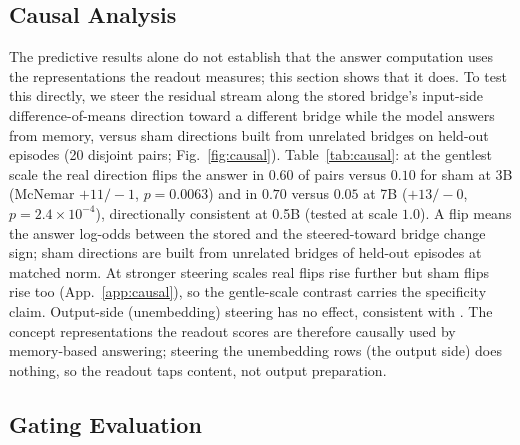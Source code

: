 

\subsection{Causal Analysis}
\label{sec:causal}

The predictive results alone do not establish that the answer computation uses
the representations the readout measures; this section shows that it does.
To test this directly, we steer the residual stream along the stored bridge's
input-side difference-of-means direction \citep{zou2023repe} toward a
different bridge while the model answers from memory, versus sham directions
built from unrelated bridges on held-out episodes (20 disjoint pairs;
Fig.~\ref{fig:causal}).
Table~\ref{tab:causal}: at the gentlest scale the real direction flips the
answer in $0.60$ of pairs versus $0.10$ for sham at 3B (McNemar $+11/-1$,
$p{=}0.0063$) and in $0.70$ versus $0.05$ at 7B ($+13/-0$,
$p{=}2.4\times10^{-4}$), directionally consistent at 0.5B (tested at scale $1.0$). A flip means the
answer log-odds between the stored and the steered-toward bridge change
sign; sham directions are built from unrelated bridges of held-out episodes
at matched norm. At stronger steering scales real flips rise further but
sham flips rise too (App.~\ref{app:causal}), so the gentle-scale contrast
carries the specificity claim. Output-side (unembedding) steering has no effect, consistent with
\citet{anthropic2026workspace}. The concept representations the readout scores are therefore causally used
by memory-based answering; steering the unembedding rows (the output side)
does nothing, so the readout taps content, not output preparation.

\subsection{Gating Evaluation}
\label{sec:prgresults}

